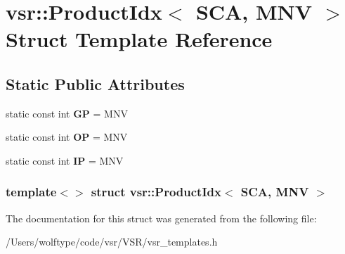 \hypertarget{structvsr_1_1_product_idx_3_01_s_c_a_00_01_m_n_v_01_4}{\section{vsr\-:\-:Product\-Idx$<$ S\-C\-A, M\-N\-V $>$ Struct Template Reference}
\label{structvsr_1_1_product_idx_3_01_s_c_a_00_01_m_n_v_01_4}
}
\subsection*{Static Public Attributes}
\begin{DoxyCompactItemize}
\item 
\hypertarget{structvsr_1_1_product_idx_3_01_s_c_a_00_01_m_n_v_01_4_a493b9ba039985e7737f1e2efd5fb3a5e}{static const int {\bfseries G\-P} = M\-N\-V}\label{structvsr_1_1_product_idx_3_01_s_c_a_00_01_m_n_v_01_4_a493b9ba039985e7737f1e2efd5fb3a5e}

\item 
\hypertarget{structvsr_1_1_product_idx_3_01_s_c_a_00_01_m_n_v_01_4_ade8c85fb3bc94a224406d608e725b312}{static const int {\bfseries O\-P} = M\-N\-V}\label{structvsr_1_1_product_idx_3_01_s_c_a_00_01_m_n_v_01_4_ade8c85fb3bc94a224406d608e725b312}

\item 
\hypertarget{structvsr_1_1_product_idx_3_01_s_c_a_00_01_m_n_v_01_4_a9467e0f533758a1f1546ac765b1f857d}{static const int {\bfseries I\-P} = M\-N\-V}\label{structvsr_1_1_product_idx_3_01_s_c_a_00_01_m_n_v_01_4_a9467e0f533758a1f1546ac765b1f857d}

\end{DoxyCompactItemize}
\subsubsection*{template$<$$>$ struct vsr\-::\-Product\-Idx$<$ S\-C\-A, M\-N\-V $>$}



The documentation for this struct was generated from the following file\-:\begin{DoxyCompactItemize}
\item 
/\-Users/wolftype/code/vsr/\-V\-S\-R/vsr\-\_\-templates.\-h\end{DoxyCompactItemize}
